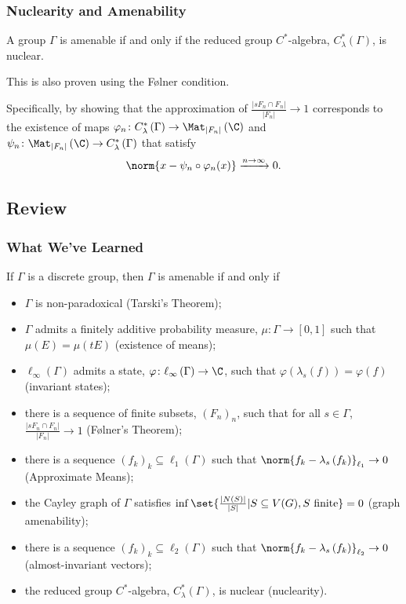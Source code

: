 \documentclass{beamer-custom}
\begin{document}
\begin{frame}
  \frametitle{Nuclearity and Amenability}
  A group $\Gamma$ is amenable if and only if the reduced group $C^{\ast}$-algebra, $C^{\ast}_{\lambda}\left( \Gamma \right)$, is nuclear.\pause\newline

  This is also proven using the Følner condition.\pause\newline

  Specifically, by showing that the approximation of $\frac{\left\vert sF_n\cap F_n \right\vert}{\left\vert F_n \right\vert} \rightarrow 1$ corresponds to the existence of maps $\varphi_n\colon C^{\ast}_{\lambda}\left( \Gamma \right)\rightarrow \Mat_{\left\vert F_n \right\vert}\left( \C \right)$ and $\psi_n\colon \Mat_{\left\vert F_n \right\vert}\left( \C \right)\rightarrow C^{\ast}_{\lambda}\left( \Gamma \right)$ that satisfy
  \begin{align*}
    \norm{x - \psi_n\circ\varphi_n(x)}\xrightarrow{n\rightarrow\infty} 0.
  \end{align*}
\end{frame}
\subsection{Review}%
\begin{frame}
  \frametitle{What We've Learned}
  \small
  If $\Gamma$ is a discrete group, then $\Gamma$ is amenable if and only if\pause
  \begin{itemize}
    \item $\Gamma$ is non-paradoxical (Tarski's Theorem);\pause
    \item $\Gamma$ admits a finitely additive probability measure, $\mu\colon \Gamma\rightarrow [0,1]$ such that $\mu\left( E \right) = \mu\left( tE \right)$ (existence of means);\pause
    \item $\ell_{\infty}\left( \Gamma \right)$ admits a state, $\varphi\colon \ell_{\infty}\left( \Gamma \right)\rightarrow \C$, such that $\varphi\left( \lambda_s(f) \right) = \varphi\left( f \right)$ (invariant states);\pause
    \item there is a sequence of finite subsets, $\left( F_n \right)_n$, such that for all $s\in\Gamma$, $\frac{\left\vert sF_n\cap F_n \right\vert}{\left\vert F_n \right\vert} \rightarrow 1$ (Følner's Theorem);\pause
    \item there is a sequence $\left( f_k \right)_k\subseteq \ell_1\left( \Gamma \right)$ such that $\norm{f_k - \lambda_s\left(f_k\right)}_{\ell_1}\rightarrow 0$ (Approximate Means);\pause
    \item the Cayley graph of $\Gamma$ satisfies $\inf\set{\frac{\left\vert N(S) \right\vert}{\left\vert S \right\vert} | S\subseteq V(G),S\text{ finite}} = 0$ (graph amenability);\pause
    \item there is a sequence $\left( f_k \right)_k\subseteq \ell_2\left( \Gamma \right)$ such that $\norm{f_k - \lambda_s\left(f_k\right)}_{\ell_2} \rightarrow 0$ (almost-invariant vectors);\pause
    \item the reduced group $C^{\ast}$-algebra, $C^{\ast}_{\lambda}\left( \Gamma \right)$, is nuclear (nuclearity).
  \end{itemize}
\end{frame}
\end{document}
